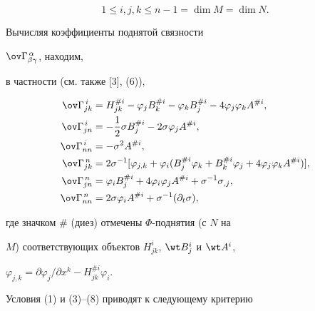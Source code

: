 $$ 


1\le i,j,k\le n-1=\dim M=\dim N. 


$$ 


Вычисляя коэффициенты поднятой связности 


$\ov\Gamma^{\,\alpha}_{\beta\gamma}$, находим, 


в частности (см. также [3], (6)), 


\begin{align} 


\ov\Gamma^{\,i}_{j k}&=H^{\# i}_{j k}-\varphi_j 


B^{\#i}_k-\varphi_k B^{\#i}_j-4\varphi_j\varphi_k A^{\# i},\\ 


% 


\ov\Gamma^{\,i}_{j n}&=-\frac{1}{2}\sigma B^{\# i}_j- 


2\sigma\varphi_j A^{\# i},\\ 


% 


\ov\Gamma^{\,i}_{n n}&=-\sigma^2 A^{\# i},\\ 


% 


\ov\Gamma^{\,n}_{j k}&=2\sigma^{-1}[\varphi_{j,k}+\varphi_i 


(B^{\# i}_j\varphi_k+B^{\# i}_k\varphi_j+ 


4\varphi_j\varphi_k A^{\# i})],\\ 


% 


\ov\Gamma^{\,n}_{j n}&=\varphi_i B^{\# i}_j+ 


4\varphi_i\varphi_j A^{\# i}+\sigma^{-1}\sigma_{,j},\\ 


% 


\ov\Gamma^{\,n}_{n n}&=2\sigma\varphi_i A^{\# i}+ 


\sigma^{-1}(\partial _t\sigma), 


\end{align} 


где значком $\#$ (диез) отмечены $\Phi$-поднятия (с $N$ на 


$M$) соответствующих объектов $H^i_{j k}$, $\wt B^i_j$ и $\wt A^i$, 


$\varphi_{j,k}=\partial\varphi_j/\partial x^k-H^{\# i}_{j k}\varphi_i$. 


 


Условия (1) и (3)--(8) приводят к следующему критерию 


